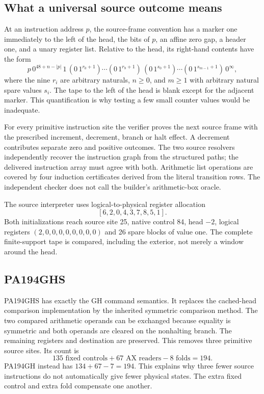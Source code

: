 \documentclass[11pt,letterpaper]{article}
\begin{document}
\subsection{What a universal source outcome means}

At an instruction address $p$, the source-frame convention has a marker
one immediately to the left of the head, the bits of $p$, an affine zero
gap, a header one, and a unary register list. Relative to the head, its
right-hand contents have the form
\[
 p\,0^{48+n-|p|}\,1\,
       (0\,1^{r_0+1})\cdots(0\,1^{r_8+1})\,
       (0\,1^{s_0+1})\cdots(0\,1^{s_{m-1}+1})\,0^\infty,
\]
where the nine $r_i$ are arbitrary naturals, $n\ge0$, and $m\ge1$ with
arbitrary natural spare values $s_i$. The tape to the left of the head is
blank except for the adjacent marker. This quantification is why testing
a few small counter values would be inadequate.

For every primitive instruction site the verifier proves the next source
frame with the prescribed increment, decrement, branch or halt effect.
A decrement contributes separate zero and positive outcomes. The two
source resolvers independently recover the instruction graph from the
structured paths; the delivered instruction array must agree with both.
Arithmetic list operations are covered by four induction certificates
derived from the literal transition rows. The independent checker does
not call the builder's arithmetic-box oracle.

The source interpreter uses logical-to-physical register allocation
\[
                      [6,2,0,4,3,7,8,5,1].
\]
Both initializations reach source site 25, native control 84, head $-2$,
logical registers $(2,0,0,0,0,0,0,0,0)$ and 26 spare blocks of value one.
The complete finite-support tape is compared, including the exterior,
not merely a window around the head.



\subsection{PA194GHS}

PA194GHS has exactly the GH command semantics. It replaces the cached-head
comparison implementation by the inherited symmetric comparison method.
The two compared arithmetic operands can be exchanged because equality is
symmetric and both operands are cleared on the nonhalting branch. The
remaining registers and destination are preserved. This removes three
primitive source sites. Its count is
\[
       135\text{ fixed controls}+67\text{ AX readers}-8\text{ folds}=194.
\]
PA194GH instead has $134+67-7=194$. This explains why three fewer source
instructions do not automatically give fewer physical states. The extra
fixed control and extra fold compensate one another.
\end{document}

